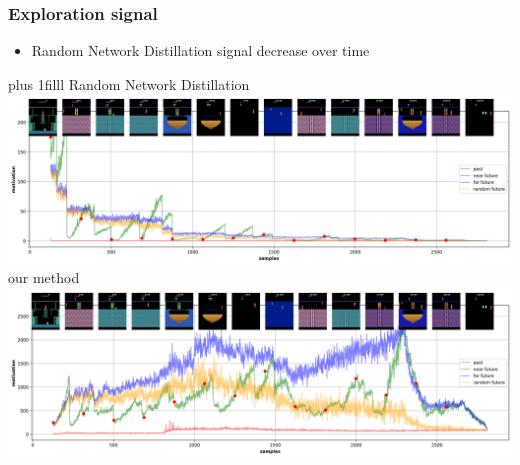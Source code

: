 \documentclass{beamer}
\begin{document}
\begin{frame}
\begin{columns}
  \end{columns}
  
\end{frame}


\begin{frame}
  \frametitle{Exploration signal}
  
  \begin{itemize}
    \item Random Network Distillation signal decrease over time
  \end{itemize} 

  \vskip 0pt plus 1filll 
  {\Large Random Network Distillation} \\
  \includegraphics[scale=0.2]{../results/novelty_detection/rnd_result_summary.png}
  \\
  {\Large our method} \\
  \includegraphics[scale=0.2]{../results/novelty_detection/cnd_vicreg_result_summary.png}

\end{frame}
\end{document}
